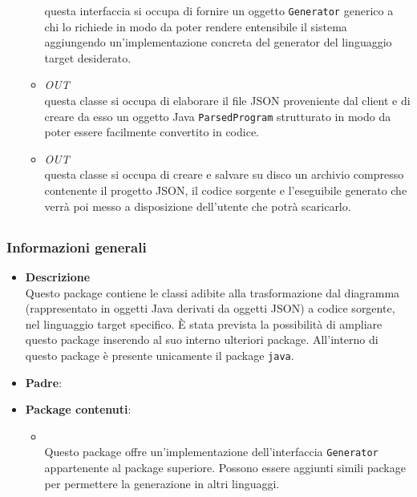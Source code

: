 \begin{itemize}
\begin{itemize}
questa interfaccia si occupa di fornire un oggetto \texttt{Generator} generico a chi lo richiede in modo da poter rendere entensibile il sistema aggiungendo un'implementazione concreta del generator del linguaggio target desiderato.
\item \textit{OUT} \hyperref[\nogloxy{swedesigner::server::parser::Parser}]{}\\
questa classe si occupa di elaborare il file JSON proveniente dal client e di creare da esso un oggetto Java \texttt{ParsedProgram} strutturato in modo da poter essere facilmente convertito in codice.
\item \textit{OUT} \hyperref[\nogloxy{swedesigner::server::utility::Compressor}]{}\\
questa classe si occupa di creare e salvare su disco un archivio compresso contenente il progetto JSON, il codice sorgente e l'eseguibile generato che verrà poi messo a disposizione dell'utente che potrà scaricarlo.
\end{itemize}
\end{itemize}
\subsection{}
\label{\nogloxy{swedesigner::server::generator}}
\subsubsection{Informazioni generali}
\begin{itemize}
\item \textbf{Descrizione}\\
Questo package contiene le classi adibite alla trasformazione dal diagramma (rappresentato in oggetti Java derivati da oggetti JSON) a codice sorgente, nel linguaggio target specifico. È stata prevista la possibilità di ampliare questo package inserendo al suo interno ulteriori package. All'interno di questo package è presente unicamente il package \texttt{java}.
\item \textbf{Padre}: \hyperref[\nogloxy{swedesigner::server}]{}
\item \textbf{Package contenuti}:
\begin{itemize}
\item \hyperref[\nogloxy{swedesigner::server::generator::java}]{}\\
Questo package offre un'implementazione dell'interfaccia \texttt{Generator} appartenente al package superiore. Possono essere aggiunti simili package per permettere la generazione in altri linguaggi.
\end{itemize}
\end{itemize}
